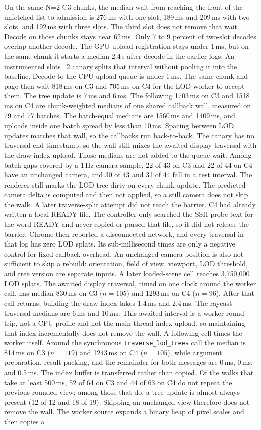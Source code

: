 \documentclass[sigconf,anonymous,review]{acmart}
\begin{document}
On the same N=2 C3 chunks, the median wait from reaching the front of the unfetched list to admission is 276\,ms with one slot, 189\,ms and 209\,ms with two slots, and 192\,ms with three slots. The third slot does not remove that wait. Decode on those chunks stays near 62\,ms. Only 7 to 9 percent of two-slot decodes overlap another decode. The GPU upload registration stays under 1\,ms, but on the same chunk it starts a median 2.4\,s after decode in the earlier logs. An instrumented slots=2 canary splits that interval without pooling it into the baseline. Decode to the CPU upload queue is under 1\,ms. The same chunk and page then wait 818\,ms on C3 and 705\,ms on C4 for the LOD worker to accept them. The tree update is 7\,ms and 6\,ms. The following 1703\,ms on C3 and 1518\,ms on C4 are chunk-weighted medians of one shared callback wall, measured on 79 and 77 batches. The batch-equal medians are 1560\,ms and 1409\,ms, and uploads inside one batch spread by less than 10\,ms. Spacing between LOD updates matches that wall, so the callbacks run back-to-back. The canary has no traversal-end timestamp, so the wall still mixes the awaited display traversal with the draw-index upload. Those medians are not added to the queue wait. Among batch gaps covered by a 1\,Hz camera sample, 22 of 43 on C3 and 22 of 44 on C4 have an unchanged camera, and 30 of 43 and 31 of 44 fall in a rest interval. The renderer still marks the LOD tree dirty on every chunk update. The predicted camera delta is computed and then not applied, so a still camera does not skip the walk. A later traverse-split attempt did not reach the barrier. C4 had already written a local READY file. The controller only searched the SSH probe text for the word READY and never copied or parsed that file, so it did not release the barrier. Chrome then reported a disconnected network, and every traversal in that log has zero LOD splats. Its sub-millisecond times are only a negative control for fixed callback overhead. An unchanged camera position is also not sufficient to skip a rebuild: orientation, field of view, viewport, LOD threshold, and tree version are separate inputs. A later loaded-scene cell reaches 3{,}750{,}000 LOD splats. The awaited display traversal, timed on one clock around the worker call, has median 830\,ms on C3 ($n{=}105$) and 1293\,ms on C4 ($n{=}96$). After that call returns, building the draw index takes 1.4\,ms and 2.4\,ms. The raycast traversal medians are 6\,ms and 10\,ms. This awaited interval is a worker round trip, not a CPU profile and not the main-thread index upload, so maintaining that index incrementally does not remove the wall. A following cell times the worker itself. Around the synchronous {\tt traverse\_lod\_trees} call the median is 814\,ms on C3 ($n{=}119$) and 1243\,ms on C4 ($n{=}105$), while argument preparation, result packing, and the remainder for both messages are 0\,ms, 0\,ms, and 0.5\,ms. The index buffer is transferred rather than copied. Of the walks that take at least 500\,ms, 52 of 64 on C3 and 44 of 63 on C4 do not repeat the previous rounded view; among those that do, a tree update is almost always present (12 of 12 and 18 of 19). Skipping an unchanged view therefore does not remove the wall. The worker source expands a binary heap of pixel scales and then copies a 
\end{document}
